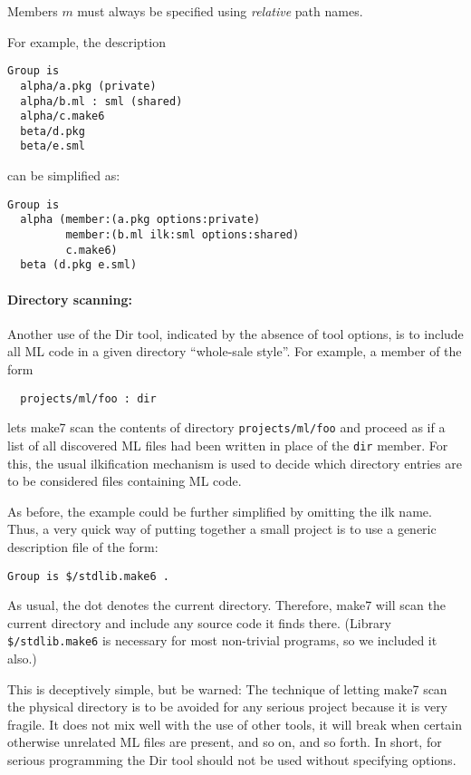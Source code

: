 Members $m$ must always be specified using {\em relative} path names.

For example, the description

\begin{verbatim}
Group is
  alpha/a.pkg (private)
  alpha/b.ml : sml (shared)
  alpha/c.make6
  beta/d.pkg
  beta/e.sml
\end{verbatim}

can be simplified as:

\begin{verbatim}
Group is
  alpha (member:(a.pkg options:private)
         member:(b.ml ilk:sml options:shared)
         c.make6)
  beta (d.pkg e.sml)
\end{verbatim}

\paragraph{Directory scanning:}
Another use of the Dir tool, indicated by the absence of tool options,
is to include all ML code in a given directory ``whole-sale style''.
For example, a member of the form

\begin{verbatim}
  projects/ml/foo : dir
\end{verbatim}

lets make7 scan the contents of directory {\tt projects/ml/foo} and
proceed as if a list of all discovered ML files had been written
in place of the {\tt dir} member.  For this, the usual ilkification
mechanism is used to decide which directory entries are to be
considered files containing ML code.

As before, the example could be further simplified by omitting the
ilk name.  Thus, a very quick way of putting together a small
project is to use a generic description file of the form:

\begin{verbatim}
Group is $/stdlib.make6 .
\end{verbatim}

As usual, the dot denotes the current directory.  Therefore, make7 will
scan the current directory and include any source code it finds there.
(Library {\tt \$/stdlib.make6} is necessary for most non-trivial programs,
so we included it also.)

This is deceptively simple, but be warned: The technique of letting make7
scan the physical directory is to be avoided for any serious project
because it is very fragile.  It does not mix well with the use of
other tools, it will break when certain otherwise unrelated ML files
are present, and so on, and so forth. In short, for serious
programming the Dir tool should not be used without specifying
options.
